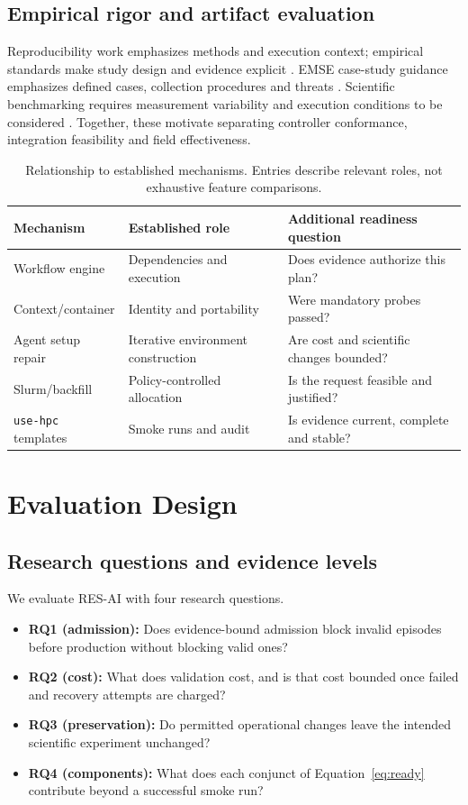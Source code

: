 \documentclass[pdflatex,sn-mathphys-num]{sn-jnl}
\theoremstyle{thmstylethree}
\newcommand{\tool}{\textsc{RES-AI}}
\newcommand{\upstream}{\texttt{use-hpc}}
\begin{document}
\subsection{Empirical rigor and artifact evaluation}
Reproducibility work emphasizes methods and execution context; empirical standards make study design and evidence explicit \cite{pineau2021improving,ralph2021standards}. EMSE case-study guidance emphasizes defined cases, collection procedures and threats \cite{runeson2009guidelines}. Scientific benchmarking requires measurement variability and execution conditions to be considered \cite{hoefler2015scientific}. Together, these motivate separating controller conformance, integration feasibility and field effectiveness.
\begin{table}[t]
\caption{Relationship to established mechanisms. Entries describe relevant roles, not exhaustive feature comparisons.}\label{tab:position}
\small\begin{tabularx}{\textwidth}{lXX}
\toprule Mechanism & Established role & Additional readiness question \\
\midrule
Workflow engine & Dependencies and execution & Does evidence authorize this plan? \\
Context/container & Identity and portability & Were mandatory probes passed? \\
Agent setup repair & Iterative environment construction & Are cost and scientific changes bounded? \\
Slurm/backfill & Policy-controlled allocation & Is the request feasible and justified? \\
\upstream{} templates & Smoke runs and audit & Is evidence current, complete and stable? \\
\bottomrule\end{tabularx}
\end{table}



\section{Evaluation Design}\label{sec:evaluation}
\subsection{Research questions and evidence levels}\label{sec:rqs}
We evaluate \tool{} with four research questions.
\begin{itemize}
\item \textbf{RQ1 (admission):} Does evidence-bound admission block invalid episodes before production without blocking valid ones?
\item \textbf{RQ2 (cost):} What does validation cost, and is that cost bounded once failed and recovery attempts are charged?
\item \textbf{RQ3 (preservation):} Do permitted operational changes leave the intended scientific experiment unchanged?
\item \textbf{RQ4 (components):} What does each conjunct of Equation~\eqref{eq:ready} contribute beyond a successful smoke run?
\end{itemize}
\end{document}
